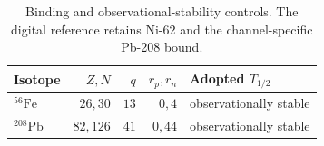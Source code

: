 \begin{table}[htbp]
\centering\small
\begin{tabular}{lrrrl}
\toprule
Isotope & $Z,N$ & $q$ & $r_p,r_n$ & Adopted $T_{1/2}$ \\
\midrule
$^{56}\mathrm{Fe}$ & $26,30$ & $13$ & $0,4$ & observationally stable \\
$^{208}\mathrm{Pb}$ & $82,126$ & $41$ & $0,44$ & observationally stable \\
\bottomrule
\end{tabular}
\caption{Binding and observational-stability controls. The digital reference retains Ni-62 and the channel-specific Pb-208 bound.}
\label{tab:isotope-benchmarks}
\end{table}

